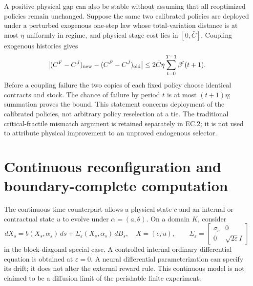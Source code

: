 A positive physical gap can also be stable without assuming that all reoptimized policies remain unchanged. Suppose the same two calibrated policies are deployed under a perturbed exogenous one-step law whose total-variation distance is at most $\eta$ uniformly in regime, and physical stage cost lies in $[0,\bar C]$. Coupling exogenous histories gives
\begin{equation}\label{eq:robust}
 \left|(C^F-C^J)_{\rm new}-(C^F-C^J)_{\rm old}\right|
 \leq 2\bar C\eta\sum_{t=0}^{T-1}\beta^t(t+1).
\end{equation}
Before a coupling failure the two copies of each fixed policy choose identical contracts and stock. The chance of failure by period $t$ is at most $(t+1)\eta$; summation proves the bound. This statement concerns deployment of the calibrated policies, not arbitrary policy reselection at a tie. The traditional critical-fractile mismatch argument is retained separately in EC.2; it is not used to attribute physical improvement to an unproved endogenous selector.

\section{Continuous reconfiguration and boundary-complete computation}\label{sec:continuous}
The continuous-time counterpart allows a physical state $c$ and an internal or contractual state $u$ to evolve under $\alpha=(a,\theta)$. On a domain $K$, consider
\begin{equation}\label{eq:sde}
 dX_s=b(X_s,\alpha_s)\,ds+\Sigma_\varepsilon(X_s,\alpha_s)\,dB_s,
 \quad X=(c,u),\qquad
 \Sigma_\varepsilon=\begin{bmatrix}\sigma_c&0\\0&\sqrt{2\varepsilon}I\end{bmatrix}
\end{equation}
in the block-diagonal special case. A controlled internal ordinary differential equation is obtained at $\varepsilon=0$. A neural differential parameterization can specify its drift; it does not alter the external reward rule. This continuous model is not claimed to be a diffusion limit of the perishable finite experiment.


